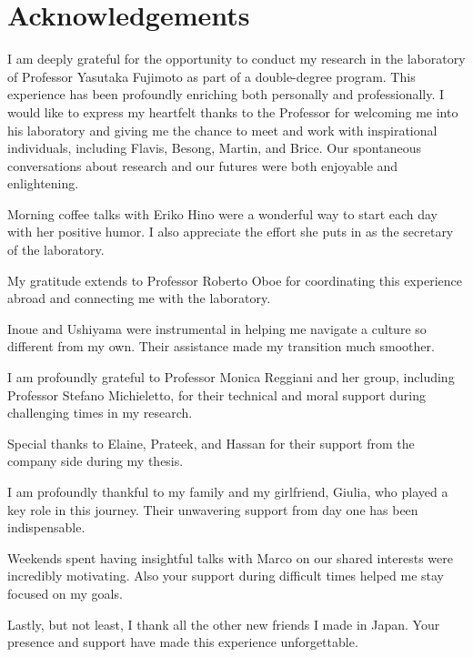 \thispagestyle{empty}
\section*{Acknowledgements}
\vspace{0.5cm}
I am deeply grateful for the opportunity to conduct my research in the laboratory 
of Professor Yasutaka Fujimoto as part of a double-degree program. This experience 
has been profoundly enriching both personally and professionally. I would like 
to express my heartfelt thanks to the Professor for welcoming me into his laboratory and 
giving me the chance to meet and work with inspirational individuals, including 
Flavis, Besong, Martin, and Brice. Our spontaneous conversations about research 
and our futures were both enjoyable and enlightening.

Morning coffee talks with Eriko Hino were a wonderful way to start each day with 
her positive humor. I also appreciate the effort she puts in as the secretary of 
the laboratory.

My gratitude extends to Professor Roberto Oboe for coordinating this experience 
abroad and connecting me with the laboratory.

Inoue and Ushiyama were instrumental in helping me navigate a culture so different 
from my own. Their assistance made my transition much smoother.

I am profoundly grateful to Professor Monica Reggiani and her group, including 
Professor Stefano Michieletto, for their technical and moral support during 
challenging times in my research.

Special thanks to Elaine, Prateek, and Hassan for their support from the company 
side during my thesis.

I am profoundly thankful to my family and my girlfriend, Giulia, who played a 
key role in this journey. Their unwavering support from day one has been indispensable.

Weekends spent having insightful talks with Marco on our shared interests were 
incredibly motivating. Also your support during difficult times helped me stay 
focused on my goals.

Lastly, but not least, I thank all the other new friends I made in Japan. Your 
presence and support have made this experience unforgettable.
\afterpage{\blankpage}
